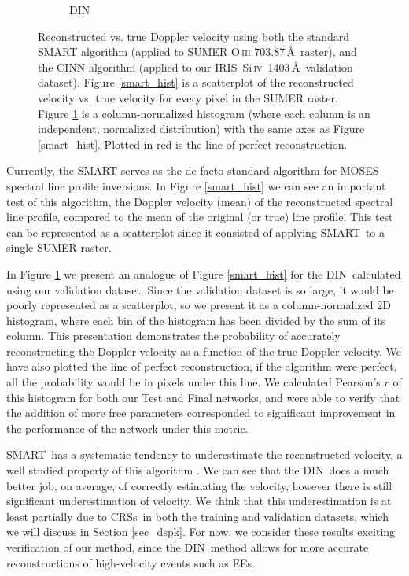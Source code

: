 \documentclass[10pt,letterpaper]{article}
\newcommand{\SiIV}{Si\,\textsc{iv}~1403\,\AA}
\newcommand{\OIII}{O\,\textsc{iii} 703.87\,\AA}
\newcommand{\EEs}{\acp{EE}}
\newcommand{\SMART}{\ac{SMART}}
\newcommand{\DIN}{\ac{DIN}}
\newcommand{\IRIS}{\ac{IRIS}}
\newcommand{\CRSs}{\acp{CRS}}
\begin{document}
\begin{figure}[t!]
\begin{subfigure}[t]{0.45\textwidth}
					\caption{DIN}
					\label{din_hist}
				\end{subfigure}
				\caption{Reconstructed vs. true Doppler velocity using both the standard SMART algorithm (applied to SUMER \OIII\ raster)\citep{Kankelborg2004}, and the CINN algorithm (applied to our \IRIS\ \SiIV\ validation dataset). Figure \ref{smart_hist} is a scatterplot of the reconstructed velocity vs. true velocity for every pixel in the SUMER raster. Figure \ref{din_hist} is a column-normalized histogram (where each column is an independent, normalized distribution) with the same axes as Figure \ref{smart_hist}. Plotted in red is the line of perfect reconstruction.}
				\label{dopp_hist}
			\end{figure}

			Currently, the \SMART\citep{fox1} serves as the de facto standard algorithm for MOSES spectral line profile inversions.
			In Figure \ref{smart_hist} we can see an important test of this algorithm, the Doppler velocity (mean) of the reconstructed spectral line profile, compared to the mean of the original (or true) line profile.
			This test can be represented as a scatterplot since it consisted of applying \SMART\ to a single SUMER raster.
			
			In Figure \ref{din_hist} we present an analogue of Figure \ref{smart_hist} for the \DIN\ calculated using our validation dataset.
			Since the validation dataset is so large, it would be poorly represented as a scatterplot, so we present it as a column-normalized 2D histogram, where each bin of the histogram has been divided by the sum of its column.
			This presentation demonstrates the probability of accurately reconstructing the Doppler velocity as a function of the true Doppler velocity.
			We have also plotted the line of perfect reconstruction, if the algorithm were perfect, all the probability would be in pixels under this line.
			We calculated Pearson's $r$ of this histogram for both our Test and Final networks, and were able to verify that the addition of more free parameters corresponded to significant improvement in the performance of the network under this metric.
			
			\SMART\ has a systematic tendency to underestimate the reconstructed velocity, a well studied property of this algorithm \citep{Fox2011,Rust2017}.
			We can see that the \DIN\ does a much better job, on average, of correctly estimating the velocity, however there is still significant underestimation of velocity.
			We think that this underestimation is at least partially due to \CRSs\ in both the training and validation datasets, which we will discuss in Section \ref{sec_dspk}.
			For now, we consider these results exciting verification of our method, since the \DIN\ method allows for more accurate reconstructions of high-velocity events such as \EEs.		
						
\end{document}
